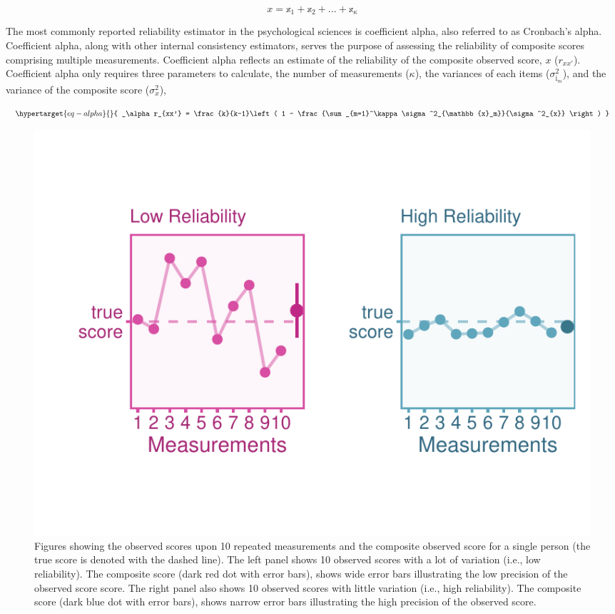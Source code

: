 \documentclass[
  letterpaper,
  DIV=11,
  numbers=noendperiod]{scrreprt}
\begin{document}
\[
x = \mathbb{x}_1 + \mathbb{x}_2 +...+\mathbb{x}_\kappa
\]

The most commonly reported reliability estimator in the psychological
sciences is coefficient alpha, also referred to as Cronbach's alpha.
Coefficient alpha, along with other internal consistency estimators,
serves the purpose of assessing the reliability of composite scores
comprising multiple measurements. Coefficient alpha reflects an estimate
of the reliability of the composite observed score, \(x\) (\(r_{xx'}\)).
Coefficient alpha only requires three parameters to calculate, the
number of measurements (\(\kappa\)), the variances of each items
(\(\sigma^2_{\text{i}_m}\)), and the variance of the composite score
(\(\sigma^2_{x}\)),

\begin{equation}\protect\hypertarget{eq-alpha}{}{
_\alpha r_{xx'} = \frac{k}{k-1}\left( 1 - \frac{\sum_{m=1}^\kappa \sigma^2_{\mathbb{x}_m}}{\sigma^2_{x}} \right)
}\label{eq-alpha}\end{equation}

\begin{figure}

{\centering \includegraphics{unreliability_files/figure-pdf/unnamed-chunk-1-1.pdf}

}

\caption{Figures showing the observed scores upon 10 repeated
measurements and the composite observed score for a single person (the
true score is denoted with the dashed line). The left panel shows 10
observed scores with a lot of variation (i.e., low reliability). The
composite score (dark red dot with error bars), shows wide error bars
illustrating the low precision of the observed score score. The right
panel also shows 10 observed scores with little variation (i.e., high
reliability). The composite score (dark blue dot with error bars), shows
narrow error bars illustrating the high precision of the observed
score.}

\end{figure}
\end{document}
